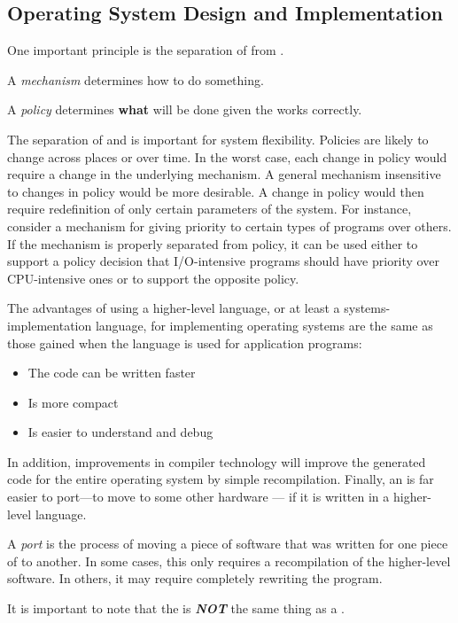 \subsection{Operating System Design and Implementation}\label{subsec:OS_Design_Implementation}
One important principle is the separation of  from .
\begin{definition}[Mechanism]\label{def:Mechanism}
  A \emph{mechanism} determines how to do something.
\end{definition}

\begin{definition}[Policy]\label{def:Policy}
  A \emph{policy} determines \textbf{what} will be done given the  works correctly.
\end{definition}

The separation of  and  is important for system flexibility.
Policies are likely to change across places or over time.
In the worst case, each change in policy would require a change in the underlying mechanism.
A general mechanism insensitive to changes in policy would be more desirable.
A change in policy would then require redefinition of only certain parameters of the system.
For instance, consider a mechanism for giving priority to certain types of programs over others.
If the mechanism is properly separated from policy, it can be used either to support a policy decision that I/O-intensive programs should have priority over CPU-intensive ones or to support the opposite policy.

The advantages of using a higher-level language, or at least a systems-implementation language, for implementing operating systems are the same as those gained when the language is used for application programs:
\begin{itemize}[noitemsep]
\item The code can be written faster
\item Is more compact
\item Is easier to understand and debug
\end{itemize}

In addition, improvements in compiler technology will improve the generated code for the entire operating system by simple recompilation.
Finally, an  is far easier to port—to move to some other hardware —
if it is written in a higher-level language.

\begin{definition}[Port]\label{def:Software_Port}
  A \emph{port} is the process of moving a piece of software that was written for one piece of  to another.
  In some cases, this only requires a recompilation of the higher-level software.
  In others, it may require completely rewriting the program.

  \begin{remark}\label{rmk:Software_Port_Confusion}
    It is important to note that the  is \textbf{\emph{NOT}} the same thing as a .
  \end{remark}
\end{definition}

